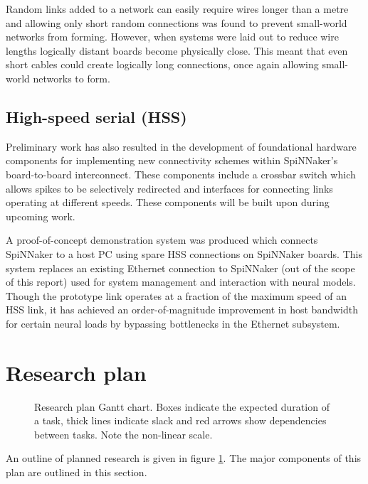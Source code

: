 		Random links added to a network can easily require wires longer than a metre
		and allowing only short random connections was found to prevent small-world
		networks from forming. However, when systems were laid out to reduce wire
		lengths logically distant boards become physically close. This meant that
		even short cables could create logically long connections, once again
		allowing small-world networks to form.
	
	
	\subsection{High-speed serial (HSS)}
		
		Preliminary work has also resulted in the development of foundational
		hardware components for implementing new connectivity schemes within
		SpiNNaker's board-to-board interconnect. These components include a crossbar
		switch \cite{dally04} which allows spikes to be selectively redirected and
		interfaces for connecting links operating at different speeds.  These
		components will be built upon during upcoming work.
		
		A proof-of-concept demonstration system was produced which connects
		SpiNNaker to a host PC using spare HSS connections on SpiNNaker boards. This
		system replaces an existing Ethernet connection to SpiNNaker (out of the
		scope of this report) used for system management and interaction with neural
		models. Though the prototype link operates at a fraction of the maximum
		speed of an HSS link, it has achieved an order-of-magnitude improvement in
		host bandwidth for certain neural loads by bypassing bottlenecks in the
		Ethernet subsystem.


\section{Research plan}
	
	\begin{figure}
		\center
		
		
		\caption{Research plan Gantt chart. Boxes indicate the expected duration of
		a task, thick lines indicate slack and red arrows show dependencies between
		tasks. Note the non-linear scale.}
		\label{fig:plan-gantt}
	\end{figure}
	
	An outline of planned research is given in figure \ref{fig:plan-gantt}. The
	major components of this plan are outlined in this section.
	
